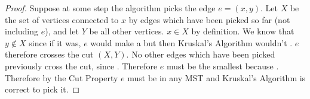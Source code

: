 \documentclass{tufte-handout}
\begin{document}
\begin{proof}
  Suppose at some step the algorithm picks the edge $e = (x,y)$.  Let
  $X$ be the set of vertices connected to $x$ by edges which have been
  picked so far (not including $e$), and let $Y$ be all other
  vertices. $x \in X$ by definition.  We know that $y \notin X$ since
  if it was, $e$ would make a  but then Kruskal's
  Algorithm wouldn't . $e$ therefore crosses
  the cut $(X,Y)$. No other edges which have been picked previously
  cross the cut, since . Therefore $e$ must be the smallest
   because . Therefore by
  the Cut Property $e$ must be in any MST and Kruskal's Algorithm is
  correct to pick it.
\end{proof}
\end{document}
